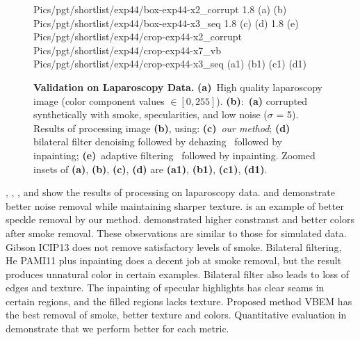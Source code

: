 \begin{figure}[!h]
     {Pics/pgt/shortlist/exp44/box-exp44-x2_corrupt}  {1.8} {(a)} {(b)}
     {Pics/pgt/shortlist/exp44/box-exp44-x3_seq} {1.8} {(c)} {(d)}
     {1.8} {(e)}
     {Pics/pgt/shortlist/exp44/crop-exp44-x2_corrupt} {Pics/pgt/shortlist/exp44/crop-exp44-x7_vb} {Pics/pgt/shortlist/exp44/crop-exp44-x3_seq}  {(a1)} {(b1)} {(c1)} {(d1)}
    \caption
    {
        {\bf Validation on Laparoscopy Data. }
        {\bf (a)}~High quality laparoscopy image (color component values $\in [0,255]$).
        {\bf (b)}:~{\bf (a)} corrupted synthetically with smoke, specularities, and low noise ($\sigma$ = 5).
        Results of processing image {\bf (b)}, using:
        {\bf (c)}~{\em our method};
        {\bf (d)}~ bilateral filter denoising followed by dehazing~\cite{he2011dark} followed by inpainting;
        {\bf (e)}~adaptive filtering~\cite{gibson2013wiener} followed by inpainting.
        Zoomed insets of {\bf (a)}, {\bf (b)}, {\bf (c)}, {\bf (d)} are {\bf (a1)}, {\bf (b1)}, {\bf (c1)}, {\bf (d1)}.
    }
    \label{fig:imagesPgt4}
\end{figure}


, , , and  show the results of processing on laparoscopy data.  and  demonstrate better noise removal while maintaining sharper texture. is an example of better speckle removal by our method.  demonstrated higher constranst and better colors after smoke removal. These observations are similar to those for simulated data. Gibson ICIP13 \cite{gibson2013wiener} does not remove satisfactory levels of smoke. Bilateral filtering, He PAMI11 \cite{he2011dark} plus inpainting does a decent job at smoke removal, but the result produces unnatural color in certain examples. Bilateral filter also leads to loss of edges and texture. The inpainting of specular highlights has clear seams in certain regions, and the filled regions lacks texture. Proposed method VBEM has the best removal of smoke, better texture and colors. Quantitative evaluation in  demonstrate that we perform better for each metric.

